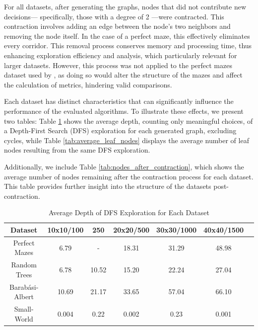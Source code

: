 For all datasets, after generating the graphs, nodes that did not contribute new decisions— specifically, those with a degree of 2 —were contracted. This contraction involves adding an edge between the node's two neighbors and removing the node itself. In the case of a perfect maze, this effectively eliminates every corridor. This removal process conserves memory and processing time, thus enhancing exploration efficiency and analysis, which particularly relevant for larger datasets. However, this process was not applied to the perfect mazes dataset used by , as doing so would alter the structure of the mazes and affect the calculation of metrics, hindering valid comparisons.

Each dataset has distinct characteristics that can significantly influence the performance of the evaluated algorithms. To illustrate these effects, we present two tables: Table \ref{tab:average_depth} shows the average depth, counting only meaningful choices, of a Depth-First Search (DFS) exploration for each generated graph, excluding cycles, while Table \ref{tab:average_leaf_nodes} displays the average number of leaf nodes resulting from the same DFS exploration.

Additionally, we include Table \ref{tab:nodes_after_contraction}, which shows the average number of nodes remaining after the contraction process for each dataset. This table provides further insight into the structure of the datasets post-contraction.

\begin{table}[H]
    \centering
    \caption{Average Depth of DFS Exploration for Each Dataset}
    \label{tab:average_depth}
    \begin{tabular}{|c|c|c|c|c|c|c|} 
        \hline
        \textbf{Dataset} & \textbf{10x10/100} & \textbf{250} & \textbf{20x20/500} & \textbf{30x30/1000} & \textbf{40x40/1500} \\ 
        \hline
        Perfect Mazes & 6.79 & - & 18.31 & 31.29 & 48.98 \\ 
        \hline
        Random Trees & 6.78 & 10.52 & 15.20 & 22.24 & 27.04 \\ 
        \hline
        Barabási-Albert & 10.69 & 21.17 & 33.65 & 57.04 & 66.10 \\ 
        \hline
        Small-World & 0.004 & 0.22 & 0.002 & 0.23 & 0.001
        \\
        \hline
    \end{tabular}
\end{table}

